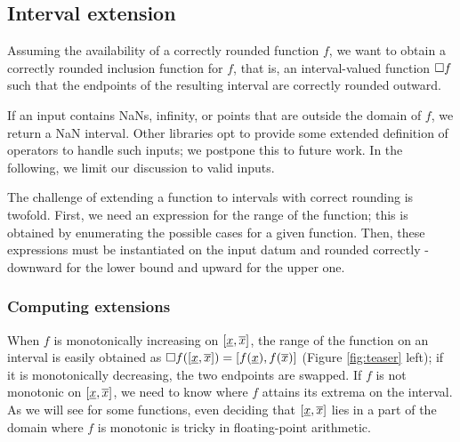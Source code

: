 \subsection{Interval extension}
Assuming the availability of a correctly rounded function $f$, we want to obtain a correctly rounded inclusion function for $f$, that is, an interval-valued function $\Box f$ such that the endpoints of the resulting interval are correctly rounded outward.


If an input contains NaNs, infinity, or points that are outside the domain of $f$, we return a NaN interval.
Other libraries opt to provide some extended definition of operators to handle such inputs; we postpone this to future work.
In the following, we limit our discussion to valid inputs.

The challenge of extending a function to intervals with correct rounding is twofold.
First, we need an expression for the range of the function; this is obtained by enumerating the possible cases for a given function.
Then, these expressions must be instantiated on the input datum and rounded correctly - downward for the lower bound and upward for the upper one.


\subsubsection{Computing extensions}
When $f$ is monotonically increasing on $[\underline{x}, \overline{x}]$, the range of the function on an interval is easily obtained as $\Box f([\underline{x}, \overline{x}]) = [f(\underline{x}), f(\overline{x})]$ (Figure \ref{fig:teaser} left); if it is monotonically decreasing, the two endpoints are swapped.
If $f$ is not monotonic on $[\underline{x}, \overline{x}]$, we need to know where $f$ attains its extrema on the interval. As we will see for some functions, even deciding that $[\underline{x}, \overline{x}]$ lies in a part of the domain where $f$ is monotonic is tricky in floating-point arithmetic.

